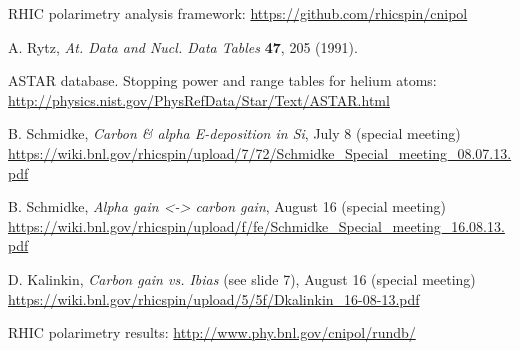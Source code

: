 \documentclass[a4paper,12pt]{article}
\begin{document}
\clearpage
\begin{thebibliography}{9} %

RHIC polarimetry analysis framework: \url{https://github.com/rhicspin/cnipol}

A. Rytz, \emph{At. Data and Nucl. Data Tables} \textbf{47}, 205 (1991).

ASTAR database. Stopping power and range tables for helium atoms:
\url{http://physics.nist.gov/PhysRefData/Star/Text/ASTAR.html}

B. Schmidke,
\emph{Carbon \& alpha E-deposition in Si}, July 8 (special meeting)
\url{https://wiki.bnl.gov/rhicspin/upload/7/72/Schmidke_Special_meeting_08.07.13.pdf}

B. Schmidke,
\emph{Alpha gain <-> carbon gain}, August 16 (special meeting)
\url{https://wiki.bnl.gov/rhicspin/upload/f/fe/Schmidke_Special_meeting_16.08.13.pdf}

D. Kalinkin,
\emph{Carbon gain vs. Ibias} (see slide 7), August 16 (special meeting)
\url{https://wiki.bnl.gov/rhicspin/upload/5/5f/Dkalinkin_16-08-13.pdf}

RHIC polarimetry results: \url{http://www.phy.bnl.gov/cnipol/rundb/}

\end{thebibliography}
\end{document}
